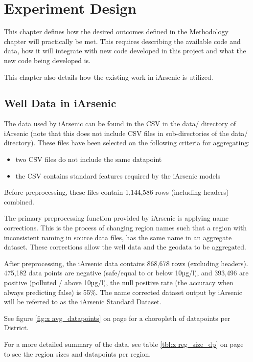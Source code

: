 \chapter{Experiment Design}

This chapter defines how the desired outcomes defined in the Methodology chapter will practically be met. This requires describing the available code and data, how it will integrate with new code developed in this project and what the new code being developed is.

This chapter also details how the existing work in iArsenic is utilized.

\section{Well Data in iArsenic}

The data used by iArsenic can be found in the CSV in the data/ directory of iArsenic (note that this does not include CSV files in sub-directories of the data/ directory). These files have been selected on the following criteria for aggregating:

\begin{itemize}
    \item two CSV files do not include the same datapoint
    \item the CSV contains standard features required by the iArsenic models
\end{itemize}

Before preprocessing, these files contain 1,144,586 rows (including headers) combined.

The primary preprocessing function provided by iArsenic is applying name corrections. This is the process of changing region names such that a region with inconsistent naming in source data files, has the same name in an aggregate dataset. These corrections allow the well data and the geodata to be aggregated.

After preprocessing, the iArsenic data contains 868,678 rows (excluding headers). 475,182 data points are negative (safe/equal to or below 10µg/l), and 393,496 are positive (polluted / above 10µg/l), the null positive rate (the accuracy when always predicting false) is 55\%. The name corrected dataset output by iArsenic will be referred to as the iArsenic Standard Dataset.

See figure \ref{fig:x avg_datapoints} on page \pageref{fig:x avg_datapoints} for a choropleth of datapoints per District.

For a more detailed summary of the data, see table \ref{tbl:x reg_size_dp} on page \pageref{tbl:x reg_size_dp} to see the region sizes and datapoints per region.


